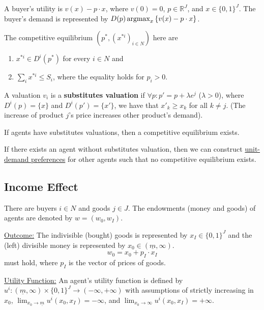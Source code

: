 \documentclass[11pt]{elegantbook}
\newcommand{\argmax}{\operatornamewithlimits{argmax}}
\begin{document}
A buyer's utility is $v(x)-p\cdot x$, where $v(0)=0$, $p\in \mathbb{R}^J$, and $x\in \{0,1\}^J$. The buyer's demand is represented by $D(p)\argmax_{x}\left\{v(x)-p\cdot x\right\}$.

The competitive equilibrium $\left(p^*,(x^{*i})_{i\in N}\right)$ here are
\begin{enumerate}
    \item $x^{*i}\in D^i(p^*)$ for every $i\in N$ and
    \item $\sum_{i}x^{*i}\leq S_i$, where the equality holds for $p_i>0$.
\end{enumerate}

\begin{definition}
    \normalfont
    A valuation $v_i$ is a \textbf{substitutes valuation} if $\forall p: p'=p+\lambda e^j$ ($\lambda>0$), where $D^i(p)=\{x\}$ and $D^i(p')=\{x'\}$, we have that $x'_k\geq x_k$ for all $k\neq j$. (The increase of product $j$'s price increases other product's demand).
\end{definition}

\begin{theorem}\label{thm:substitute}
    If agents have substitutes valuations, then a competitive equilibrium exists.
\end{theorem}

\begin{theorem}
    If there exists an agent without substitutes valuation, then we can construct \underline{unit-demand preferences} for other agents such that no competitive equilibrium exists.
\end{theorem}


\subsection{Income Effect}
There are buyers $i\in N$ and goods $j\in J$. The endowments (money and goods) of agents are denoted by $w=(w_0,w_I)$.

\underline{Outcome:} The indivisible (bought) goods is represented by $x_I\in\{0,1\}^J$ and the (left) divisible money is represented by $x_0\in(\underline{m},\infty)$. $$w_0=x_0+p_I\cdot x_I$$ must hold, where $p_I$ is the vector of prices of goods.

\underline{Utility Function:} An agent's utility function is defined by $u^i:(\underline{m},\infty)\times \{0,1\}^J \rightarrow (-\infty, +\infty)$ with assumptions of strictly increasing in $x_0$, $\lim_{x_0 \rightarrow \underline{m}}u^i(x_0,x_I)=-\infty$, and $\lim_{x_0 \rightarrow \infty}u^i(x_0,x_I)=+\infty$.
\end{document}
